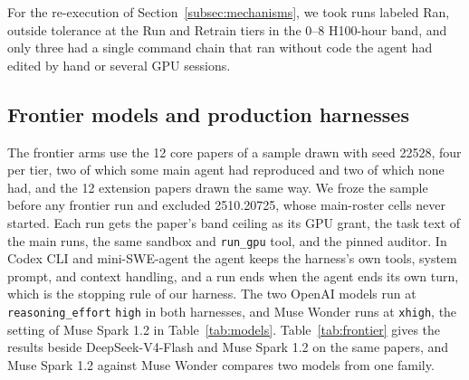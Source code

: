For the re-execution of Section~\ref{subsec:mechanisms}, we took runs labeled Ran, outside tolerance at the Run and Retrain tiers in the 0--8 H100-hour band, and only three had a single command chain that ran without code the agent had edited by hand or several GPU sessions.

\subsection{Frontier models and production harnesses}
\label{app:frontier}

The frontier arms use the 12 core papers of a sample drawn with seed 22528,
four per tier, two of which some main agent had reproduced and two of which
none had, and the 12 extension papers drawn the same way. We froze the
sample before any frontier run and excluded 2510.20725, whose main-roster
cells never started. Each run gets the paper's band ceiling as its GPU grant,
the task text of the main runs, the same sandbox and \texttt{run\_gpu} tool, and
the pinned auditor. In Codex CLI and mini-SWE-agent the agent keeps the
harness's own tools, system prompt, and context handling, and a run ends when
the agent ends its own turn, which is the stopping rule of our harness.
The two OpenAI models run at \texttt{reasoning\_effort} \texttt{high} in both
harnesses, and Muse Wonder runs at \texttt{xhigh}, the setting of Muse Spark 1.2
in Table~\ref{tab:models}.
Table~\ref{tab:frontier} gives the results beside DeepSeek-V4-Flash and Muse
Spark 1.2 on the same papers, and Muse Spark 1.2 against Muse Wonder compares
two models from one family. %

\begin{table}[ht]
\centering
\small
{\footnotesize\setlength{\tabcolsep}{4pt}}
\caption{Papers reproduced by each frontier arm, beside the two best open
agents on the papers that arm has graded.}
\label{tab:frontier}
\end{table}

